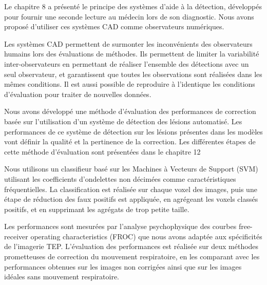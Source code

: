 Le chapitre 8 a présenté le principe des systèmes d'aide à la détection, développés pour fournir une seconde lecture au médecin lors de son diagnostic. Nous avons proposé d'utiliser ces systèmes CAD comme observateurs numériques.

Les systèmes CAD permettent de surmonter les inconvénients des observateurs humains lors des évaluations de méthodes. Ils permettent de limiter la variabilité inter-observateurs en permettant de réaliser l'ensemble des détections avec un seul observateur, et garantissent que toutes les observations sont réalisées dans les mêmes conditions. Il est aussi possible de reproduire à l'identique les conditions d'évaluation pour traiter de nouvelles données.

Nous avons développé une méthode d'évaluation des performances de correction basée sur l'utilisation d'un système de détection des lésions automatisé. Les performances de ce système de détection sur les lésions présentes dans les modèles vont définir la qualité et la pertinence de la correction. Les différentes étapes de cette méthode d'évaluation sont présentées dans le chapitre 12

Nous utilisons un classifieur basé sur les Machines à Vecteurs de Support (SVM) utilisant les coefficients d'ondelettes non décimées comme caractéristiques fréquentielles. La classification est réalisée sur chaque voxel des images, puis une étape de réduction des faux positifs est appliquée, en agrégeant les voxels classés positifs, et en supprimant les agrégats de trop petite taille.

Les performances sont mesurées par l’analyse psychophysique des courbes free-receiver operating characteristics (FROC) que nous avons adaptée aux spécificités de l’imagerie TEP. L’évaluation des performances est réalisée sur deux méthodes prometteuses de correction du mouvement respiratoire, en les comparant avec les performances obtenues sur les images non corrigées ainsi que sur les images idéales sans mouvement respiratoire.
